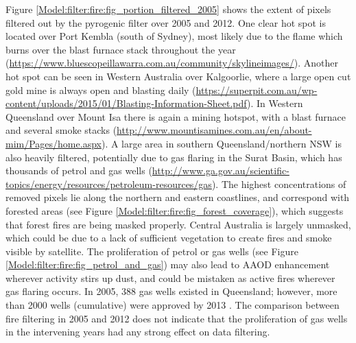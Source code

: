     
    
    
    
    Figure \ref{Model:filter:fire:fig_portion_filtered_2005} shows the extent of pixels filtered out by the pyrogenic filter over 2005 and 2012.
    One clear hot spot is located over Port Kembla (south of Sydney), most likely due to the flame which burns over the blast furnace stack throughout the year (\url{https://www.bluescopeillawarra.com.au/community/skylineimages/}).
    Another hot spot can be seen in Western Australia over Kalgoorlie, where a large open cut gold mine is always open and blasting daily (\url{https://superpit.com.au/wp-content/uploads/2015/01/Blasting-Information-Sheet.pdf}).
    In Western Queensland over Mount Isa there is again a mining hotspot, with a blast furnace and several smoke stacks (\url{http://www.mountisamines.com.au/en/about-mim/Pages/home.aspx}).
    A large area in southern Queensland/northern NSW is also heavily filtered, potentially due to gas flaring in the Surat Basin, which has thousands of petrol and gas wells (\url{http://www.ga.gov.au/scientific-topics/energy/resources/petroleum-resources/gas}).
    The highest concentrations of removed pixels lie along the northern and eastern coastlines, and correspond with forested areas (see Figure \ref{Model:filter:fire:fig_forest_coverage}), which suggests that forest fires are being masked properly.
    Central Australia is largely unmasked, which could be due to a lack of sufficient vegetation to create fires and smoke visible by satellite.
    The proliferation of petrol or gas wells (see Figure \ref{Model:filter:fire:fig_petrol_and_gas}) may also lead to AAOD enhancement wherever activity stirs up dust, and could be mistaken as active fires wherever gas flaring occurs.
    In 2005, 388 gas wells existed in Queensland; however, more than 2000 wells (cumulative) were approved by 2013 \parencite{Carlisle2012}.
    The comparison between fire filtering in 2005 and 2012 does not indicate that the proliferation of gas wells in the intervening years had any strong effect on data filtering. 
    
